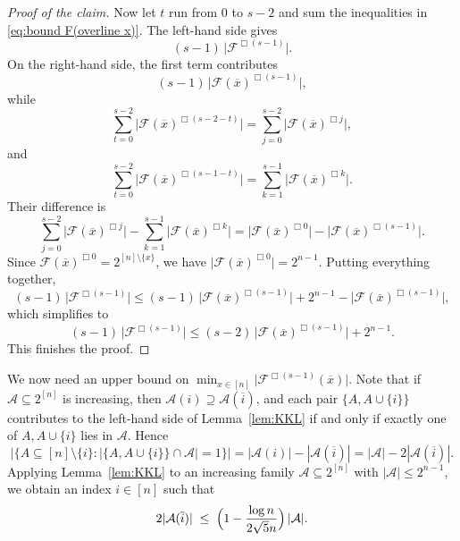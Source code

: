 \documentclass[11pt]{article}
\theoremstyle{definition}
\newenvironment{poc}{\begin{proof}[Proof of the claim]\renewcommand*{\qedsymbol}{$\blacksquare$}}{\end{proof}}
\begin{document}
\begin{poc}
Now let \(t\) run from \(0\) to \(s-2\) and sum the inequalities in \eqref{eq:bound F(overline x)}. The left-hand side gives
\[
   (s-1)\,\bigl|\mathcal{F}^{\Box(s-1)}\bigr|.
\]
On the right-hand side, the first term contributes
\[
   (s-1)\,\bigl|\mathcal{F}(\overline{x})^{\Box(s-1)}\bigr|,
\]
while
\[
   \sum_{t=0}^{s-2} \bigl|\mathcal{F}(\overline{x})^{\Box(s-2-t)}\bigr|
   = \sum_{j=0}^{s-2} \bigl|\mathcal{F}(\overline{x})^{\Box j}\bigr|,
\]
and
\[
   \sum_{t=0}^{s-2} \bigl|\mathcal{F}(\overline{x})^{\Box(s-1-t)}\bigr|
   = \sum_{k=1}^{s-1} \bigl|\mathcal{F}(\overline{x})^{\Box k}\bigr|.
\]
Their difference is
\[
   \sum_{j=0}^{s-2} \bigl|\mathcal{F}(\overline{x})^{\Box j}\bigr|
   - \sum_{k=1}^{s-1} \bigl|\mathcal{F}(\overline{x})^{\Box k}\bigr|
   = \bigl|\mathcal{F}(\overline{x})^{\Box 0}\bigr|
     - \bigl|\mathcal{F}(\overline{x})^{\Box(s-1)}\bigr|.
\]
Since \(\mathcal{F}(\overline{x})^{\Box 0} = 2^{[n]\setminus\{x\}}\), we have
\(\bigl|\mathcal{F}(\overline{x})^{\Box 0}\bigr| = 2^{n-1}\). Putting everything together,
\[
   (s-1)\,\bigl|\mathcal{F}^{\Box(s-1)}\bigr|
   \le (s-1)\,\bigl|\mathcal{F}(\overline{x})^{\Box(s-1)}\bigr|
      + 2^{n-1}
      - \bigl|\mathcal{F}(\overline{x})^{\Box(s-1)}\bigr|,
\]
which simplifies to
\[
   (s-1)\,\bigl|\mathcal{F}^{\Box(s-1)}\bigr|
   \le (s-2)\,\bigl|\mathcal{F}(\overline{x})^{\Box(s-1)}\bigr|
      + 2^{n-1}.
\]
This finishes the proof.





\end{poc}

We now need an upper bound on
\(
   \min_{x\in[n]} \bigl|\mathcal{F}^{\Box(s-1)}(\overline{x})\bigr|.
\)
Note that if $\mathcal{A}\subseteq 2^{[n]}$ is increasing, then
$\mathcal{A}(i)\supseteq\mathcal{A}(\overline{i})$, and each pair
$\{A,A\cup\{i\}\}$ contributes to the left-hand side of Lemma~\ref{lem:KKL} if and only if exactly one of $A,A\cup\{i\}$ lies in
$\mathcal{A}$. Hence
\[
   \bigl|\{A\subseteq [n]\setminus\{i\}:
          |\{A, A\cup\{i\}\}\cap\mathcal{A}|=1\}\bigr|
   = |\mathcal{A}(i)|-|\mathcal{A}(\overline{i})|
   = |\mathcal{A}|-2|\mathcal{A}(\overline{i})|.
\]
Applying Lemma~\ref{lem:KKL} to an increasing family
$\mathcal{A}\subseteq 2^{[n]}$ with $|\mathcal{A}|\le 2^{n-1}$, we
obtain an index $i\in[n]$ such that
\begin{equation}\label{eq:KKL-section-bound}
   2|\mathcal{A}(\overline{i})|
   \;\le\;
   \Bigl(1-\frac{\log n}{2\sqrt{5}n}\Bigr)\,|\mathcal{A}|.
\end{equation}
\end{document}
